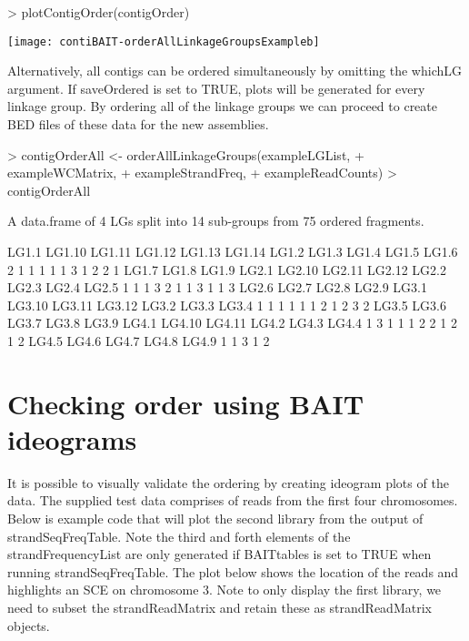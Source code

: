 \documentclass{article}
\begin{document}
\begin{Schunk}
\begin{Sinput}
> plotContigOrder(contigOrder)
\end{Sinput}
\end{Schunk}
\texttt{[image: contiBAIT-orderAllLinkageGroupsExampleb]}

Alternatively, all contigs can be ordered simultaneously by omitting the whichLG argument. If saveOrdered is set to TRUE, plots will be generated for every linkage group.  By ordering all of the linkage groups we can proceed to create BED files of these data for the new assemblies.

\begin{Schunk}
\begin{Sinput}
> contigOrderAll <- orderAllLinkageGroups(exampleLGList,
+ exampleWCMatrix,
+ exampleStrandFreq,
+ exampleReadCounts)
> contigOrderAll
\end{Sinput}
\begin{Soutput}
A data.frame of 4 LGs split into 14 sub-groups from 75 ordered fragments.

 LG1.1 LG1.10 LG1.11 LG1.12 LG1.13 LG1.14  LG1.2  LG1.3  LG1.4  LG1.5  LG1.6 
     2      1      1      1      1      1      3      1      2      2      1 
 LG1.7  LG1.8  LG1.9  LG2.1 LG2.10 LG2.11 LG2.12  LG2.2  LG2.3  LG2.4  LG2.5 
     1      1      1      3      2      1      1      3      1      1      3 
 LG2.6  LG2.7  LG2.8  LG2.9  LG3.1 LG3.10 LG3.11 LG3.12  LG3.2  LG3.3  LG3.4 
     1      1      1      1      1      1      2      1      2      3      2 
 LG3.5  LG3.6  LG3.7  LG3.8  LG3.9  LG4.1 LG4.10 LG4.11  LG4.2  LG4.3  LG4.4 
     1      3      1      1      1      2      2      1      2      1      2 
 LG4.5  LG4.6  LG4.7  LG4.8  LG4.9 
     1      1      3      1      2 
\end{Soutput}
\end{Schunk}


\section{Checking order using BAIT ideograms}

It is possible to visually validate the ordering by creating ideogram plots of the data. The supplied test data comprises of reads from the first four chromosomes. Below is example code that will plot the second library from the output of strandSeqFreqTable. Note the third and forth elements of the strandFrequencyList are only generated if BAITtables is set to TRUE when running strandSeqFreqTable.  The plot below shows the location of the reads and highlights an SCE on chromosome 3. Note to only display the first library, we need to subset the strandReadMatrix and retain these as strandReadMatrix objects.
\end{document}
